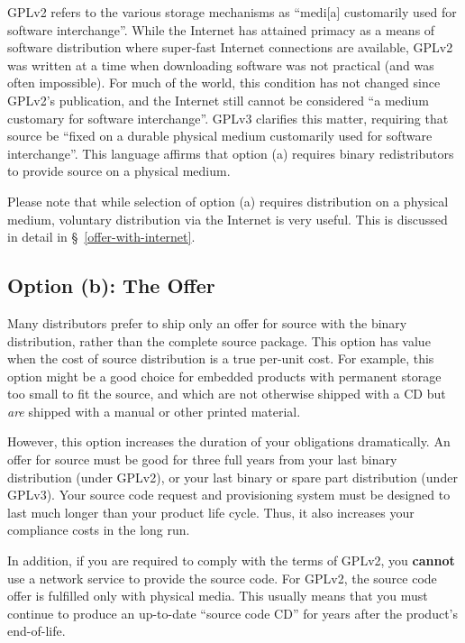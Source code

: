 GPLv2 refers to the various storage mechanisms as ``medi[a] customarily
used for software interchange''.  While the Internet has attained primacy
as a means of software distribution where super-fast Internet connections
are available, GPLv2 was written at a time when downloading software was
not practical (and was often impossible).  For much of the world, this
condition has not changed since GPLv2's publication, and the Internet
still cannot be considered ``a medium customary for software
interchange''.  GPLv3 clarifies this matter, requiring that source be
``fixed on a durable physical medium customarily used for software
interchange''.  This language affirms that option (a) requires binary
redistributors to provide source on a physical medium.

Please note that while selection of option (a) requires distribution on a
physical medium, voluntary distribution via the Internet is very useful.  This
is discussed in detail in \S~\ref{offer-with-internet}.

\subsection{Option (b): The Offer}
\label{offer-for-source}

Many distributors prefer to ship only an offer for source with the binary
distribution, rather than the complete source package.  This
option has value when the cost of source distribution is a true
per-unit cost.  For example, this option might be a good choice for
embedded products with permanent storage too small to fit the source, and
which are not otherwise shipped with a CD but \emph{are} shipped with a
manual or other printed material.

However, this option increases the duration of your obligations
dramatically.  An offer for source must be good for three full years from
your last binary distribution (under GPLv2), or your last binary or spare
part distribution (under GPLv3).  Your source code request and
provisioning system must be designed to last much longer than your product
life cycle. Thus, it also increases your compliance costs in the long
run.

In addition, if you are required to comply with the terms of GPLv2, you
{\bf cannot} use a network service to provide the source code.  For GPLv2,
the source code offer is fulfilled only with physical media.  This usually
means that you must continue to produce an up-to-date ``source code CD''
for years after the product's end-of-life.

